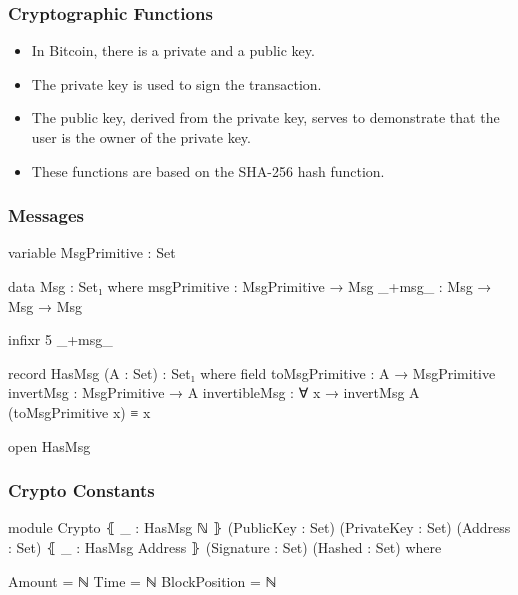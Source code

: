 \documentclass{beamer}
\begin{document}
\begin{frame}
  \frametitle{Cryptographic Functions}
  \begin{itemize}
    \item In Bitcoin, there is a private and a public key.
    \item The private key is used to sign the transaction.
    \item The public key, derived from the private key,
      serves to demonstrate that the user is the owner of the private key.
    \item These functions are based on the SHA-256 hash function.
  \end{itemize}
\end{frame}

\begin{frame}
  \frametitle{Messages}
\begin{code}

variable
  MsgPrimitive : Set

data Msg : Set₁ where
  msgPrimitive : MsgPrimitive → Msg
  _+msg_ : Msg → Msg → Msg

infixr 5 _+msg_

record HasMsg (A : Set) : Set₁ where
  field
    toMsgPrimitive : A → MsgPrimitive
    invertMsg      : MsgPrimitive → A
    invertibleMsg  : ∀ x → invertMsg {A} (toMsgPrimitive x) ≡ x

open HasMsg
\end{code}


\end{frame}

\begin{frame}
  \frametitle{Crypto Constants}
\begin{code}

module Crypto
  ⦃ _ : HasMsg ℕ ⦄
  (PublicKey : Set)
  (PrivateKey : Set)
  (Address : Set)
  ⦃ _ : HasMsg Address ⦄
  (Signature : Set)
  (Hashed : Set)
  where

  Amount = ℕ
  Time = ℕ
  BlockPosition = ℕ
\end{code}
\end{frame}
\end{document}
